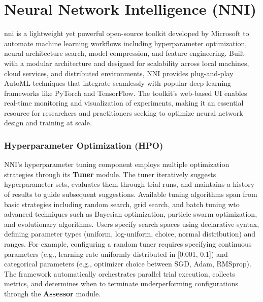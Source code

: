\section{Neural Network Intelligence (NNI)}

\gls{nni} is a lightweight yet powerful open-source toolkit developed by Microsoft to automate machine learning workflows including hyperparameter optimization, neural architecture search, model compression, and feature engineering. Built with a modular architecture and designed for scalability across local machines, cloud services, and distributed environments, NNI provides plug-and-play AutoML techniques that integrate seamlessly with popular deep learning frameworks like PyTorch and TensorFlow. The toolkit's web-based UI enables real-time monitoring and visualization of experiments, making it an essential resource for researchers and practitioners seeking to optimize neural network design and training at scale.

\subsubsection{Hyperparameter Optimization (HPO)}

NNI's hyperparameter tuning component employs multiple optimization strategies through its \textbf{Tuner} module. The tuner iteratively suggests hyperparameter sets, evaluates them through trial runs, and maintains a history of results to guide subsequent suggestions. Available tuning algorithms span from basic strategies including random search, grid search, and batch tuning wto advanced techniques such as Bayesian optimization, particle swarm optimization, and evolutionary algorithms. Users specify search spaces using declarative syntax, defining parameter types (uniform, log-uniform, choice, normal distribution) and ranges. For example, configuring a random tuner requires specifying continuous parameters (e.g., learning rate uniformly distributed in [0.001, 0.1]) and categorical parameters (e.g., optimizer choice between SGD, Adam, RMSprop). The framework automatically orchestrates parallel trial execution, collects metrics, and determines when to terminate underperforming configurations through the \textbf{Assessor} module.
